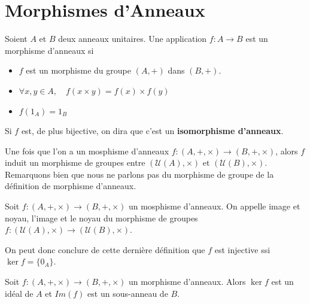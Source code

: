 \newpage 

\section{Morphismes d'Anneaux} 

\begin{definition}
		Soient $A$ et $B$ deux anneaux unitaires. Une application $f : A \longrightarrow B$ 
		est un morphisme d'anneaux si 
		\begin{itemize} 
				\item $f$ est un morphisme du groupe $(A, +)$ dans $(B, +)$. 
				\item $\forall x, y \in A, \quad f(x \times y) = f(x) \times f(y)$ 
				\item $f(1_A) = 1_B$ 
		\end{itemize} 
		Si $f$ est, de plus bijective, on dira que c'est un \textbf{isomorphisme d'anneaux}. 
\end{definition} 

\begin{proposition} 
		Une fois que l'on a un mosphisme d'anneaux $f : (A, +, \times) \longrightarrow (B, +, \times)$,
		alors $f$ induit un morphisme de groupes entre $ (\mathcal{U}(A), \times)$ et $ (\mathcal{U}(B), \times) $. 
		Remarquons bien que nous ne parlons pas du morphisme de groupe de la définition de morphisme d'anneaux. 
\end{proposition} 

\begin{definition}
		Soit $f : (A, +, \times) \longrightarrow (B, +, \times)$ un mosphisme d'anneaux. 
		On appelle image et noyau, l'image et le noyau du morphisme de groupes $f :  (\mathcal{U}(A), \times) \longrightarrow (\mathcal{U}(B), \times)$. 
\end{definition} 

\begin{remark} 
		On peut donc conclure de cette dernière définition que $f$ est injective ssi $ \ker f = \{0_A\}$.
\end{remark} 

\begin{prop}
		Soit $f : (A,+,\times) \longrightarrow (B,+,\times)$ un morphisme d'anneaux. Alors $ \ker f$ est un idéal de $A$ et 
		$Im (f)$ est un sous-anneau de $B$. 
\end{prop} 

